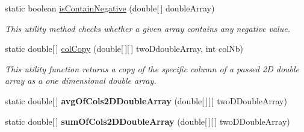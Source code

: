 \begin{DoxyCompactItemize}
\item 
static boolean \hyperlink{classuk_1_1ac_1_1dmu_1_1iesd_1_1cascade_1_1market_1_1astem_1_1util_1_1_arrays_utils_ab125f7362a22b51a0ca00c8e95a20431}{is\-Contain\-Negative} (double\mbox{[}$\,$\mbox{]} double\-Array)
\begin{DoxyCompactList}\small\item\em This utility method checks whether a given array contains any negative value. \end{DoxyCompactList}\item 
static double\mbox{[}$\,$\mbox{]} \hyperlink{classuk_1_1ac_1_1dmu_1_1iesd_1_1cascade_1_1market_1_1astem_1_1util_1_1_arrays_utils_a3a3a84d6a279575f64b2b2572c5f3106}{col\-Copy} (double\mbox{[}$\,$\mbox{]}\mbox{[}$\,$\mbox{]} two\-Ddouble\-Array, int col\-Nb)
\begin{DoxyCompactList}\small\item\em This utility function returns a copy of the specific column of a passed 2\-D double array as a one dimensional double array. \end{DoxyCompactList}\item 
\hypertarget{classuk_1_1ac_1_1dmu_1_1iesd_1_1cascade_1_1market_1_1astem_1_1util_1_1_arrays_utils_afc39e67c0cc71dbf9e6272b8dbe95e73}{static double\mbox{[}$\,$\mbox{]} {\bfseries avg\-Of\-Cols2\-D\-Double\-Array} (double\mbox{[}$\,$\mbox{]}\mbox{[}$\,$\mbox{]} two\-D\-Double\-Array)}\label{classuk_1_1ac_1_1dmu_1_1iesd_1_1cascade_1_1market_1_1astem_1_1util_1_1_arrays_utils_afc39e67c0cc71dbf9e6272b8dbe95e73}

\item 
\hypertarget{classuk_1_1ac_1_1dmu_1_1iesd_1_1cascade_1_1market_1_1astem_1_1util_1_1_arrays_utils_ad0171fe16cd37d946ec5c7924dc77975}{static double\mbox{[}$\,$\mbox{]} {\bfseries sum\-Of\-Cols2\-D\-Double\-Array} (double\mbox{[}$\,$\mbox{]}\mbox{[}$\,$\mbox{]} two\-D\-Double\-Array)}\label{classuk_1_1ac_1_1dmu_1_1iesd_1_1cascade_1_1market_1_1astem_1_1util_1_1_arrays_utils_ad0171fe16cd37d946ec5c7924dc77975}


\end{DoxyCompactItemize}

